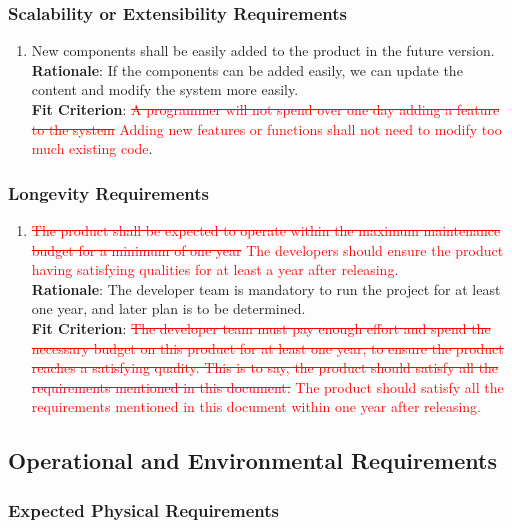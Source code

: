 \documentclass{article}
\begin{document}
\subsubsection{Scalability or Extensibility Requirements}
\begin{enumerate}[PR7.1]
    \item New components shall be easily added to the product in the future version.\\
    \textbf{Rationale}: If the components can be added easily, we can update the content and modify the system more easily.\\
    \textbf{Fit Criterion}: \textcolor{red}{\st{A programmer will not spend over one day adding a
     feature to the system} Adding new features or functions shall not need to modify too much
     existing code}.\\
\end{enumerate}
\subsubsection{Longevity Requirements}
\begin{enumerate}[PR8.1]
    \item \textcolor{red}{\st{The product shall be expected to operate within the maximum maintenance
     budget for a minimum of one year} The developers should ensure the product having 
     satisfying qualities for at least a year after releasing}.\\
    \textbf{Rationale}: The developer team is mandatory to run the project for at least one year, and
     later plan is to be determined.\\
    \textbf{Fit Criterion}: \textcolor{red}{\st{The developer team must pay enough effort and spend the
     necessary budget on
     this product for at least one year, to ensure the product reaches a satisfying quality. This is to
      say, the product should satisfy all the requirements mentioned in this document.} The product
       should satisfy all the requirements mentioned in this document within one year after
       releasing.}
\end{enumerate}

\subsection{Operational and Environmental Requirements}
\subsubsection{Expected Physical Requirements}
\end{document}

